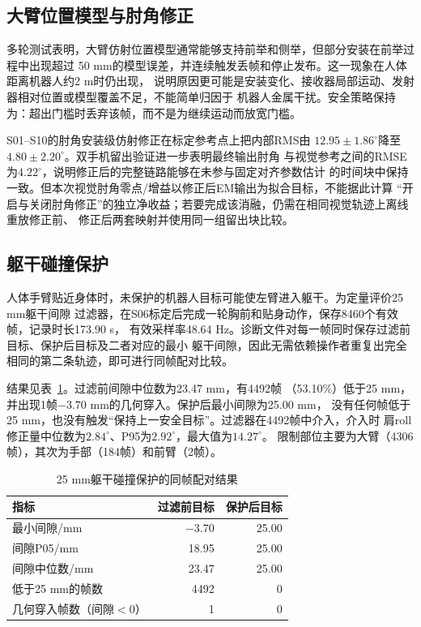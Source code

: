 \subsection{大臂位置模型与肘角修正}
\label{subsec:ch7_model_correction}

多轮测试表明，大臂仿射位置模型通常能够支持前举和侧举，但部分安装在前举过程中出现超过
50 mm的模型误差，并连续触发丢帧和停止发布。这一现象在人体距离机器人约2 m时仍出现，
说明原因更可能是安装变化、接收器局部运动、发射器相对位置或模型覆盖不足，不能简单归因于
机器人金属干扰。安全策略保持为：超出门槛时丢弃该帧，而不是为继续运动而放宽门槛。

S01--S10的肘角安装级仿射修正在标定参考点上把内部RMS由
$12.95\pm1.86^\circ$降至$4.80\pm2.20^\circ$。双手机留出验证进一步表明最终输出肘角
与视觉参考之间的RMSE为$4.22^\circ$，说明修正后的完整链路能够在未参与固定对齐参数估计
的时间块中保持一致。但本次视觉肘角零点/增益以修正后EM输出为拟合目标，不能据此计算
“开启与关闭肘角修正”的独立净收益；若要完成该消融，仍需在相同视觉轨迹上离线重放修正前、
修正后两套映射并使用同一组留出块比较。

\subsection{躯干碰撞保护}
\label{subsec:ch7_torso_collision}

人体手臂贴近身体时，未保护的机器人目标可能使左臂进入躯干。为定量评价25 mm躯干间隙
过滤器，在S06标定后完成一轮胸前和贴身动作，保存8460个有效帧，记录时长173.90 s，
有效采样率48.64 Hz。诊断文件对每一帧同时保存过滤前目标、保护后目标及二者对应的最小
躯干间隙，因此无需依赖操作者重复出完全相同的第二条轨迹，即可进行同帧配对比较。

结果见表~\ref{tab:ch7_collision_results}。过滤前间隙中位数为23.47 mm，有4492帧
（53.10\%）低于25 mm，并出现1帧$-3.70$ mm的几何穿入。保护后最小间隙为25.00 mm，
没有任何帧低于25 mm，也没有触发“保持上一安全目标”。过滤器在4492帧中介入，介入时
肩roll修正量中位数为$2.84^\circ$、P95为$2.92^\circ$，最大值为$14.27^\circ$。
限制部位主要为大臂（4306帧），其次为手部（184帧）和前臂（2帧）。

\begin{table}[htbp]
  \centering
  \small
  \caption{25 mm躯干碰撞保护的同帧配对结果}
  \label{tab:ch7_collision_results}
  \begin{tabular}{@{}lrr@{}}
    \toprule
    指标 & 过滤前目标 & 保护后目标 \\
    \midrule
    最小间隙/mm & $-3.70$ & 25.00 \\
    间隙P05/mm & 18.95 & 25.00 \\
    间隙中位数/mm & 23.47 & 25.00 \\
    低于25 mm的帧数 & 4492 & 0 \\
    几何穿入帧数（间隙$<0$） & 1 & 0 \\
    \bottomrule
  \end{tabular}
\end{table}

